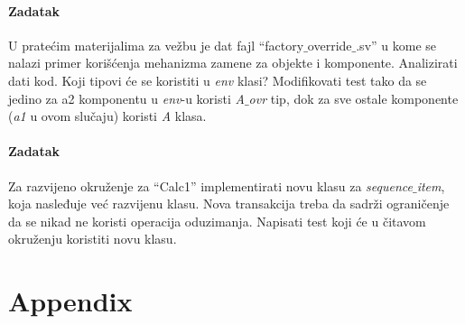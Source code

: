 \paragraph{Zadatak}

U pratećim materijalima za vežbu je dat fajl
``factory\(\_\)override\(\_\).sv'' u kome se nalazi primer korišćenja
mehanizma zamene za objekte i komponente. Analizirati dati kod. Koji tipovi će
se koristiti u \emph{env} klasi? Modifikovati test tako da se jedino za a2
komponentu u \emph{env}-u koristi \emph{A\(\_\)ovr} tip, dok za sve ostale
komponente (\emph{a1} u ovom slučaju) koristi \emph{A} klasa.

\paragraph{Zadatak}

Za razvijeno okruženje za ``Calc1'' implementirati novu klasu za
\emph{sequence\(\_\)item}, koja nasleđuje već razvijenu klasu. Nova transakcija
treba da sadrži ograničenje da se nikad ne koristi operacija oduzimanja.
Napisati test koji će u čitavom okruženju koristiti novu klasu.


\section{Appendix}





